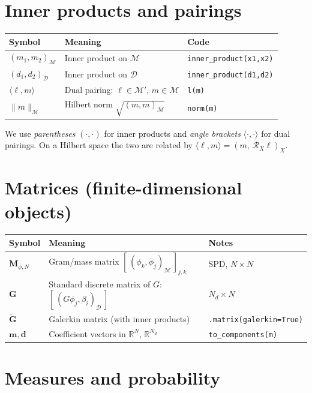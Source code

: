 \documentclass[11pt,twoside,openright]{book}
\theoremstyle{plain}
\theoremstyle{definition}
\theoremstyle{remark}
\newcommand{\modelspace}{\mathcal{M}}
\newcommand{\dataspace}{\mathcal{D}}
\begin{document}
\section*{Inner products and pairings}

\begin{longtable}{lll}
\toprule
Symbol & Meaning & Code \\
\midrule
$(m_1, m_2)_{\modelspace}$ & Inner product on $\modelspace$ & \texttt{inner\_product(x1,x2)} \\
$(d_1, d_2)_{\dataspace}$ & Inner product on $\dataspace$ & \texttt{inner\_product(d1,d2)} \\
$\langle \ell, m \rangle$ & Dual pairing: $\ell \in \modelspace',\, m \in \modelspace$ & \texttt{l(m)} \\
$\|m\|_{\modelspace}$ & Hilbert norm $\sqrt{(m,m)_{\modelspace}}$ & \texttt{norm(m)} \\
\bottomrule
\end{longtable}

We use \emph{parentheses} $(\cdot,\cdot)$ for inner products and
\emph{angle brackets} $\langle\cdot,\cdot\rangle$ for dual pairings.
On a Hilbert space the two are related by
$\langle \ell, m \rangle = (m,\, \mathcal{R}_X \ell)_X$.

\section*{Matrices (finite-dimensional objects)}

\begin{longtable}{lll}
\toprule
Symbol & Meaning & Notes \\
\midrule
$\mathbf{M}_{\phi,N}$ & Gram/mass matrix $[\,(\phi_k,\phi_j)_{\modelspace}\,]_{j,k}$ & SPD, $N\times N$ \\
$\mathbf{G}$ & Standard discrete matrix of $G$: $[\,(G\phi_j,\beta_i)_{\dataspace}\,]$ & $N_d \times N$ \\
$\tilde{\mathbf{G}}$ & Galerkin matrix (with inner products) & \texttt{.matrix(galerkin=True)} \\
$\mathbf{m}, \mathbf{d}$ & Coefficient vectors in $\mathbb{R}^N$, $\mathbb{R}^{N_d}$ & \texttt{to\_components(m)} \\
\bottomrule
\end{longtable}

\section*{Measures and probability}
\end{document}
